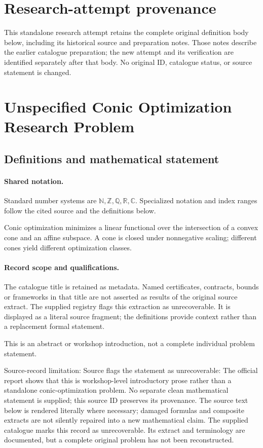 \documentclass[11pt]{article}
\begin{document}
\section*{Research-attempt provenance}
This standalone research attempt retains the complete original definition body below,
including its historical source and preparation notes. Those notes describe the
earlier catalogue preparation; the new attempt and its verification are identified
separately after that body. No original ID, catalogue status, or source statement is changed.

\section{Unspecified Conic Optimization Research Problem}\label{statement}

\subsection{Definitions and mathematical statement}

\paragraph{Shared notation.}Standard number systems are $\mathbb N,\mathbb Z,\mathbb Q,\mathbb R,\mathbb C$. Specialized notation and index ranges follow the cited source and the definitions below.


Conic optimization minimizes a linear functional over the intersection of a convex cone and an affine subspace. A cone is closed under nonnegative scaling; different cones yield different optimization classes.
\paragraph{Record scope and qualifications.}
The catalogue title is retained as metadata. Named certificates, contracts, bounds or frameworks in that title are not asserted as results of the original source extract.
The supplied registry flags this extraction as unrecoverable. It is displayed as a literal source fragment; the definitions provide context rather than a replacement formal statement.

This is an abstract or workshop introduction, not a complete individual problem statement.

Source-record limitation: Source flags the statement as unrecoverable: The official report shows that this is workshop-level introductory prose rather than a standalone conic-optimization problem. No separate clean mathematical statement is supplied; this source ID preserves its provenance.
The source text below is rendered literally where necessary; damaged formulas and composite extracts are not silently repaired into a new mathematical claim.
The supplied catalogue marks this record as unrecoverable. Its extract and terminology are documented, but a complete original problem has not been reconstructed.
\end{document}
